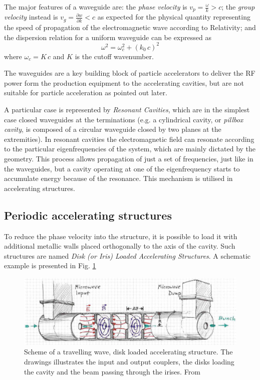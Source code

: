 The major features of a waveguide are: the \textit{phase velocity} is $v_p=\frac{\omega}{k} > c$; the \textit{group velocity} instead is $v_g = \frac{\partial w}{\partial k} < c$ as expected for the physical quantity representing the speed of propagation of the electromagnetic wave according to Relativity; and  the dispersion relation for a uniform waveguide can be expressed as 
\begin{equation}
\omega^2 = \omega^2_c + (k_0 \, c)^2
\end{equation}
where $\omega_c = K \, c$ and $K$ is the cutoff wavenumber.

The waveguides are a key building block of particle accelerators to deliver the RF power form the production equipment to the accelerating cavities, but are not suitable for particle acceleration as pointed out later.

A particular case is represented by \textit{Resonant Cavities}, which are in the simplest case closed waveguides at the terminations (e.g. a cylindrical cavity, or \textit{pillbox cavity}, is composed of a circular waveguide closed by two planes at the extremities). In resonant cavities the electromagnetic field can resonate according to the particular eigenfrequencies of the system, which are mainly dictated by the geometry. This process allows propagation of just a set of frequencies, just like in the waveguides, but a cavity operating at one of the eigenfrequency starts to accumulate energy because of the resonance. This mechanism is utilised in accelerating structures.


\subsection[Periodic accelerating structures]{Periodic accelerating structures}

To reduce the phase velocity into the structure, it is possible to load it with additional metallic walls placed orthogonally to the axis of the cavity.  Such structures are named \textit{Disk (or Iris) Loaded Accelerating Structures}. A schematic example is presented in Fig. \ref{ACS_scheme}

\begin{figure}[h]
\centering

\includegraphics[scale=0.45]{pictures/scheme_ACS}
\caption{Scheme of a travelling wave, disk loaded accelerating structure. The drawings illustrates the input and output couplers, the disks loading the cavity and the beam passing through the irises. From \cite{streun}}
\label{ACS_scheme}

\end{figure}


